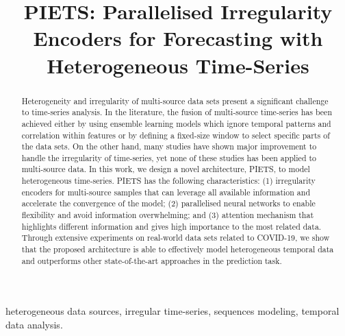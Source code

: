 \documentclass[conference]{IEEEtran}
\begin{document}
\newcommand{\name}{PIETS}


\title{PIETS: Parallelised Irregularity Encoders for Forecasting with Heterogeneous Time-Series}

 \author{
 }
\maketitle



\begin{abstract}
Heterogeneity and irregularity of multi-source data sets present a significant challenge to time-series analysis. In the literature, the fusion of multi-source time-series has been achieved either by using ensemble learning models which ignore temporal patterns and correlation within features or by defining a fixed-size window to select specific parts of the data sets. On the other hand, many studies have shown major improvement to handle the irregularity of time-series, yet none of these studies has been applied to multi-source data. In this work, we design a novel architecture, PIETS, to model heterogeneous time-series. PIETS has the following characteristics: (1) irregularity encoders for multi-source samples that can leverage all available information and accelerate the convergence of the model; (2) parallelised neural networks to enable flexibility and avoid information overwhelming; and (3) attention mechanism that highlights different information and gives high importance to the most related data. Through extensive experiments on real-world data sets related to COVID-19, we show that the proposed architecture is able to effectively model heterogeneous temporal data and outperforms other state-of-the-art approaches in the prediction task.
\end{abstract}

\begin{IEEEkeywords}
heterogeneous data sources, irregular time-series, sequences modeling, temporal data analysis.
\end{IEEEkeywords}
\end{document}
